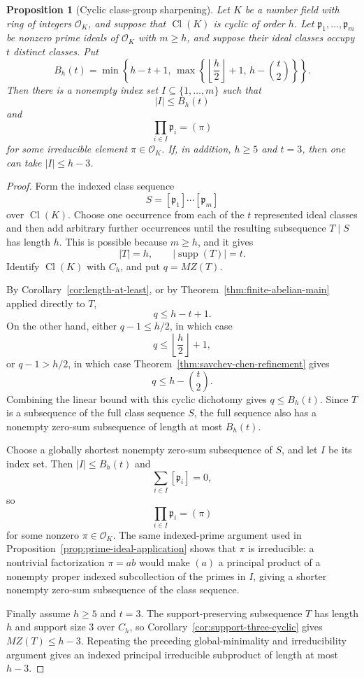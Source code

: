 \documentclass[12pt,reqno]{amsart}
\newtheorem{proposition}[theorem]{Proposition}
\theoremstyle{definition}
\theoremstyle{remark}
\DeclareMathOperator{\supp}{supp}
\newcommand{\Cl}{\operatorname{Cl}}
\newcommand{\cO}{\mathcal O}
\begin{document}
\begin{proposition}[Cyclic class-group sharpening]\label{prop:cyclic-class-group-sharpening}
Let $K$ be a number field with ring of integers $\cO_K$, and suppose that $\Cl(K)$ is cyclic of order $h$.  Let $\mathfrak p_1,\ldots,\mathfrak p_m$ be nonzero prime ideals of $\cO_K$ with $m\ge h$, and suppose their ideal classes occupy $t$ distinct classes.  Put
\[
 B_h(t)=
 \min\left\{
 h-t+1,\,
 \max\left\{\left\lfloor\frac h2\right\rfloor+1,\,
 h-\binom{t}{2}\right\}
 \right\}.
\]
Then there is a nonempty index set $I\subseteq\{1,\ldots,m\}$ such that
\[
 |I|\le B_h(t)
\]
and
\[
 \prod_{i\in I}\mathfrak p_i=(\pi)
\]
for some irreducible element $\pi\in\cO_K$.  If, in addition, $h\ge 5$ and $t=3$, then one can take $|I|\le h-3$.
\end{proposition}

\begin{proof}
Form the indexed class sequence
\[
  S=[\mathfrak p_1]\cdots[\mathfrak p_m]
\]
over $\Cl(K)$.  Choose one occurrence from each of the $t$ represented ideal classes and then add arbitrary further occurrences until the resulting subsequence $T\mid S$ has length $h$.  This is possible because $m\ge h$, and it gives
\[
  |T|=h,\qquad |\supp(T)|=t.
\]
Identify $\Cl(K)$ with $C_h$, and put $q=MZ(T)$.

By Corollary~\ref{cor:length-at-least}, or by Theorem~\ref{thm:finite-abelian-main} applied directly to $T$,
\[
  q\le h-t+1.
\]
On the other hand, either $q-1\le h/2$, in which case
\[
  q\le \left\lfloor\frac h2\right\rfloor+1,
\]
or $q-1>h/2$, in which case Theorem~\ref{thm:savchev-chen-refinement} gives
\[
  q\le h-\binom{t}{2}.
\]
Combining the linear bound with this cyclic dichotomy gives $q\le B_h(t)$.  Since $T$ is a subsequence of the full class sequence $S$, the full sequence also has a nonempty zero-sum subsequence of length at most $B_h(t)$.

Choose a globally shortest nonempty zero-sum subsequence of $S$, and let $I$ be its index set.  Then $|I|\le B_h(t)$ and
\[
  \sum_{i\in I}[\mathfrak p_i]=0,
\]
so
\[
  \prod_{i\in I}\mathfrak p_i=(\pi)
\]
for some nonzero $\pi\in\cO_K$.  The same indexed-prime argument used in Proposition~\ref{prop:prime-ideal-application} shows that $\pi$ is irreducible: a nontrivial factorization $\pi=ab$ would make $(a)$ a principal product of a nonempty proper indexed subcollection of the primes in $I$, giving a shorter nonempty zero-sum subsequence of the class sequence.

Finally assume $h\ge 5$ and $t=3$.  The support-preserving subsequence $T$ has length $h$ and support size $3$ over $C_h$, so Corollary~\ref{cor:support-three-cyclic} gives $MZ(T)\le h-3$.  Repeating the preceding global-minimality and irreducibility argument gives an indexed principal irreducible subproduct of length at most $h-3$.
\end{proof}
\end{document}
